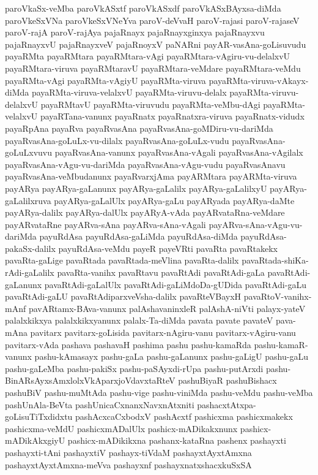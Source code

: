 {paroVkaSx-veMba
paroVkASxtf
paroVkASxdf
paroVkASxBAyxsa-diMda
paroVkeSxVNa
paroVkeSxVNeYva
paroV-deVvaH
paroV-rajasi
paroV-rajaseV
paroV-rajA
paroV-rajAya
pajaRnayx
pajaRnayxginxya
pajaRnayxvu
pajaRnayxvU
pajaRnayxveV
pajaRnoyxV
paNARni
payAR-vasAna-goLisuvudu
payaRMta
payaRMtara
payaRMtara-vAgi
payaRMtara-vAgiru-vu-delalxvU
payaRMtara-viruva
payaRMtaravU
payaRMtara-veMdare
payaRMtara-veMdu
payaRMta-vAgi
payaRMta-vAgiyU
payaRMta-viruva
payaRMta-viruva-vAkayx-diMda
payaRMta-viruva-velalxvU
payaRMta-viruvu-delalx
payaRMta-viruvu-delalxvU
payaRMtavU
payaRMta-viruvudu
payaRMta-veMbu-dAgi
payaRMta-velalxvU
payaRTana-vanunx
payaRnatx
payaRnatxra-viruva
payaRnatx-vidudx
payaRpAna
payaRva
payaRvasAna
payaRvasAna-goMDiru-vu-dariMda
payaRvasAna-goLuLx-vu-dilalx
payaRvasAna-goLuLx-vudu
payaRvasAna-goLuLxvuvu
payaRvasAna-vanunx
payaRvasAna-vAgali
payaRvasAna-vAgilalx
payaRvasAna-vAgu-vu-dariMda
payaRvasAna-vAgu-vudu
payaRvasAnavu
payaRvasAna-veMbudanunx
payaRvarxjAma
payARMtara
payARMta-viruva
payARya
payARya-gaLanunx
payARya-gaLalilx
payARya-gaLalilxyU
payARya-gaLalilxruva
payARya-gaLalUlx
payARya-gaLu
payARyada
payARya-daMte
payARya-dalilx
payARya-dalUlx
payARyA-vAda
payARvataRna-veMdare
payARvataRne
payARva-sAna
payARva-sAna-vAgali
payARva-sAna-vAgu-vu-dariMda
payuRdAsa
payuRdAsa-gaLiMda
payuRdAsa-diMda
payuRdAsa-pakaSx-dalilx
payuRdAsa-veMdu
payeR
payeVRti
pavaRta
pavaRtakekx
pavaRta-gaLige
pavaRtada
pavaRtada-meVlina
pavaRta-dalilx
pavaRtada-shiKa-rAdi-gaLalilx
pavaRta-vanihx
pavaRtavu
pavaRtAdi
pavaRtAdi-gaLa
pavaRtAdi-gaLanunx
pavaRtAdi-gaLalUlx
pavaRtAdi-gaLiMdoDa-gUDida
pavaRtAdi-gaLu
pavaRtAdi-gaLU
pavaRtAdiparxveVsha-dalilx
pavaRteVBayxH
pavaRtoV-vanihx-mAnf
pavARtamx-BAva-vanunx
palAshavaninxleR
palAshA-niVti
palayx-yateV
palalxkikxya
palalxkikxyanunx
palalx-Ta-diMda
pavata
pavate
pavateV
pava-mAna
pavitarx
pavitarx-goLisida
pavitarx-nAgiru-vanu
pavitarx-vAgiru-vanu
pavitarx-vAda
pashava
pashavaH
pashima
pashu
pashu-kamaRda
pashu-kamaR-vanunx
pashu-kAmasayx
pashu-gaLa
pashu-gaLanunx
pashu-gaLigU
pashu-gaLu
pashu-gaLeMba
pashu-pakiSx
pashu-paSAyxdi-rUpa
pashu-putArxdi
pashu-BinARsAyxsAmxlolxVkAparxjoVdavxtaRteV
pashuBiyaR
pashuBishacx
pashuBiV
pashu-muMtAda
pashu-vige
pashu-viniMda
pashu-veMdu
pashu-veMba
pashUnAla-BeVta
pashUnicaCxnanxNavxnAtxniti
pashacxtAtxpa-goLisuTiTxdidxtu
pashAcxcaCxbodxV
pashAcxtf
pashicxma
pashicxmakekx
pashicxma-veMdU
pashicxmADalUlx
pashicx-mADikakxnunx
pashicx-mADikAkxgiyU
pashicx-mADikikxna
pashanx-kataRna
pashenx
pashayxti
pashayxti-tAni
pashayxtiV
pashayx-tiVdaM
pashayxtAyxtAmxna
pashayxtAyxtAmxna-meVva
pashayxnf
pashayxnatxshacxkuSxSA
}
